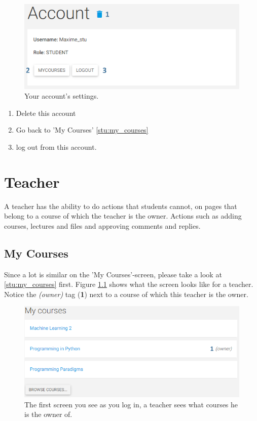 \documentclass[a4paper,11pt]{report}
\begin{document}
\begin{figure}[H]
\centering
\includegraphics[scale=0.55]{imgs/stu_account.png}
\caption{Your account's settings.}
\label{fig:stu_account}
\end{figure}
\begin{enumerate}
\item Delete this account
\item Go back to 'My Courses' \ref{stu:my_courses}
\item log out from this account.
\end{enumerate}


\chapter{Teacher}
A teacher has the ability to do actions that students cannot, on pages that belong to a course of which the teacher is the owner. Actions such as adding courses, lectures and files and approving comments and replies.

\section{My Courses}
Since a lot is similar on the 'My Courses'-screen, please take a look at \ref{stu:my_courses} first. Figure \ref{fig:tea_my_courses} shows what the screen looks like for a teacher. Notice the \textit{(owner)} tag (\textbf{1}) next to a course of which this teacher is the owner.

\begin{figure}[H]
\centering
\includegraphics[scale=0.55]{imgs/tea_my_courses.png}
\caption{The first screen you see as you log in, a teacher sees what courses he is the owner of.}
\label{fig:tea_my_courses}
\end{figure}
\end{document}
